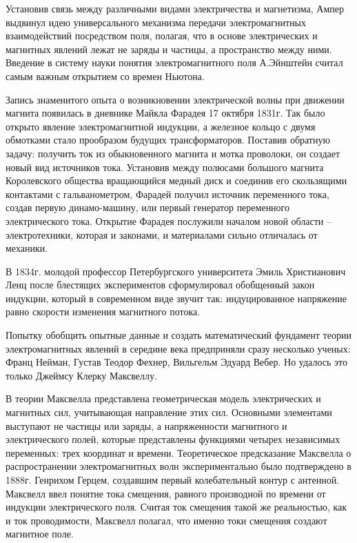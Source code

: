 \documentclass[exam_answers.tex]{subfiles}
\begin{document}
Установив связь между различными видами электричества и магнетизма,
Ампер выдвинул идею универсального механизма передачи электромагнитных
взаимодействий посредством поля, полагая, что в основе электрических и
магнитных явлений лежат не заряды и частицы, а пространство между ними.
Введение в систему науки понятия электромагнитного поля А.Эйнштейн
считал самым важным открытием со времен Ньютона.

Запись знаменитого опыта о возникновении электрической волны при
движении магнита появилась в дневнике Майкла Фарадея 17 октября 1831г. Так
было открыто явление электромагнитной индукции, а железное кольцо с двумя
обмотками стало прообразом будущих трансформаторов. Поставив обратную
задачу: получить ток из обыкновенного магнита и мотка проволоки, он создает
новый вид источников тока. Установив между полюсами большого магнита
Королевского общества вращающийся медный диск и соединив его
скользящими контактами с гальванометром, Фарадей получил источник
переменного тока, создав первую динамо-машину, или первый генератор
переменного электрического тока. Открытие Фарадея послужили началом
новой области – электротехники, которая и законами, и материалами сильно
отличалась от механики.

В 1834г. молодой профессор Петербургского университета Эмиль
Христианович Ленц после блестящих экспериментов сформулировал
обобщенный закон индукции, который в современном виде звучит так:
индуцированное напряжение равно скорости изменения магнитного потока.

Попытку обобщить опытные данные и создать математический фундамент
теории электромагнитных явлений в середине века предприняли сразу
несколько ученых: Франц Нейман, Густав Теодор Фехнер, Вильгельм Эдуард
Вебер. Но удалось это только Джеймсу Клерку Максвеллу.

В теории Максвелла представлена геометрическая модель электрических и
магнитных сил, учитывающая направление этих сил. Основными элементами
выступают не частицы или заряды, а напряженности магнитного и
электрического полей, которые представлены функциями четырех независимых
переменных: трех координат и времени. Теоретическое предсказание
Максвелла о распространении электромагнитных волн экспериментально было
подтверждено в 1888г. Генрихом Герцем, создавшим первый колебательный
контур с антенной. Максвелл ввел понятие тока смещения, равного
производной по времени от индукции электрического поля. Считая ток
смещения такой же реальностью, как и ток проводимости, Максвелл полагал,
что именно токи смещения создают магнитное поле.
\end{document}
